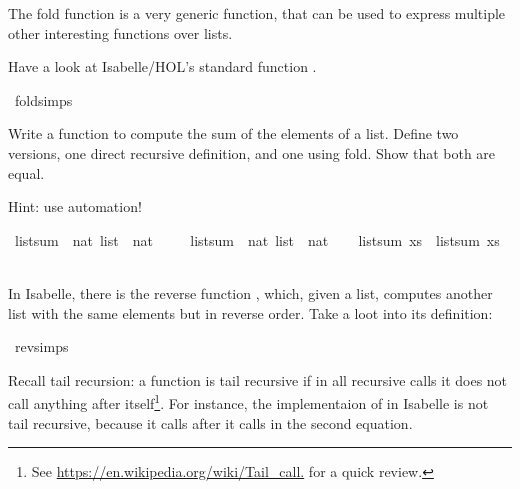 %
\begin{isabellebody}%
%
%
\isadelimtheory
%
\endisadelimtheory
%
\isatagtheory
%
\endisatagtheory
{\isafoldtheory}%
%
\isadelimtheory
%
\endisadelimtheory
%
\begin{isamarkuptext}%
%
\end{isamarkuptext}\isamarkuptrue%
%
\begin{isamarkuptext}%
  The fold function is a very generic function, that can be used to express 
  multiple other interesting functions over lists.%
\end{isamarkuptext}\isamarkuptrue%
%
\begin{isamarkuptext}%
Have a look at Isabelle/HOL's standard function .%
\end{isamarkuptext}\isamarkuptrue%
\isamarkupfalse%
\ fold{\isachardot}{\kern0pt}simps%
\begin{isamarkuptext}%
Write a function to compute the sum of the elements of a list. 
  Define two versions, one direct recursive definition, and one using fold.
  Show that both are equal.

  Hint: use automation!%
\end{isamarkuptext}\isamarkuptrue%
\isamarkupfalse%
\ list{\isacharunderscore}{\kern0pt}sum\ {\isacharcolon}{\kern0pt}{\isacharcolon}{\kern0pt}\ {\isachardoublequoteopen}nat\ list\ {\isasymRightarrow}\ nat{\isachardoublequoteclose}\ \isanewline
\ \ \isanewline
{}\isamarkupfalse%
\ list{\isacharunderscore}{\kern0pt}sum{\isacharprime}{\kern0pt}\ {\isacharcolon}{\kern0pt}{\isacharcolon}{\kern0pt}\ {\isachardoublequoteopen}nat\ list\ {\isasymRightarrow}\ nat{\isachardoublequoteclose}\isanewline
\ \ %
\isadelimproof
%
\endisadelimproof
%
\isatagproof
%
\endisatagproof
{\isafoldproof}%
%
\isadelimproof
\isanewline
%
\endisadelimproof
{}\isamarkupfalse%
\ {\isachardoublequoteopen}list{\isacharunderscore}{\kern0pt}sum\ xs\ {\isacharequal}{\kern0pt}\ list{\isacharunderscore}{\kern0pt}sum{\isacharprime}{\kern0pt}\ xs{\isachardoublequoteclose}\isanewline
\ \ %
\isadelimproof
%
\endisadelimproof
%
\isatagproof
%
\endisatagproof
{\isafoldproof}%
%
\isadelimproof
%
\endisadelimproof
%
\begin{isamarkuptext}%
In Isabelle, there is the reverse function , which, given a list, computes another list
with the same elements but in reverse order.
Take a loot into its definition:%
\end{isamarkuptext}\isamarkuptrue%
\isamarkupfalse%
\ rev{\isachardot}{\kern0pt}simps%
\begin{isamarkuptext}%
Recall tail recursion: a function is tail recursive if in all recursive calls it does not call 
  anything after itself\footnote{See \url{https://en.wikipedia.org/wiki/Tail_call.} for a quick review.}.
  For instance, the implementaion of  in Isabelle is not tail recursive, because it calls
  \isa{{\isacharparenleft}{\kern0pt}{\isacharat}{\kern0pt}{\isacharparenright}{\kern0pt}} after it calls  in the second equation.
  

\end{isamarkuptext}
\end{isabellebody}
